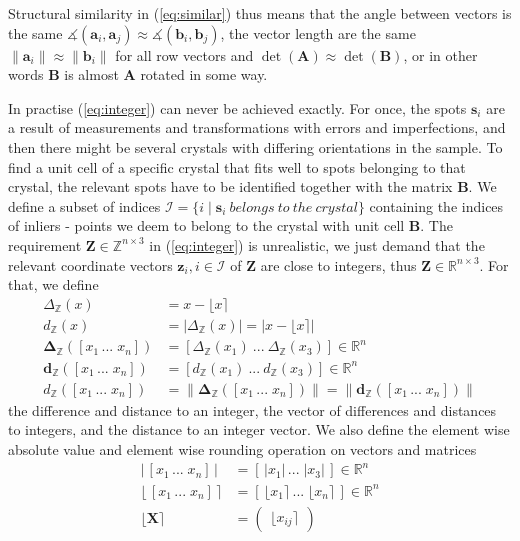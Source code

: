 \documentclass[a4paper,10pt]{article}
\newcommand{\vect}[1]{\mathbf{#1}}
\newcommand{\mat}[1]{\mathbf{#1}}
\newcommand{\round}[1]{\lfloor #1 \rceil}
\newcommand{\distZ}[1]{d_\mathbb{Z}(#1)}
\newcommand{\diffZ}[1]{\Delta_\mathbb{Z}(#1)}
\newcommand{\distvecZ}[1]{\vect{d}_\mathbb{Z}(#1)}
\newcommand{\diffvecZ}[1]{\vect{\Delta}_\mathbb{Z}(#1)}
\begin{document}
%
Structural similarity in (\ref{eq:similar}) thus means that the angle between vectors is the same $\measuredangle(\vect{a}_i, \vect{a}_j) \approx \measuredangle(\vect{b}_i, \vect{b}_j)$, the vector length are the same $\|\vect{a}_i\| \approx \|\vect{b}_i\|$ for all row vectors and $\det(\mat{A}) \approx \det(\mat{B})$, or in other words $\mat{B}$ is almost $\mat{A}$ rotated in some way.

In practise (\ref{eq:integer}) can never be achieved exactly. For once, the spots $\vect{s}_i$ are a result of measurements and transformations with errors and imperfections, and then there might be several crystals with differing orientations in the sample. To find a unit cell of a specific crystal that fits well to spots belonging to that crystal, the relevant spots have to be identified together with the matrix $\mat{B}$. We define a subset of indices $\mathcal{I} = \{i \mid \vect{s}_i\ belongs\ to\ the\ crystal \}$ containing the indices of inliers - points we deem to belong to the crystal with unit cell $\mat{B}$. The requirement $\mat{Z} \in \mathbb{Z}^{n \times 3}$ in (\ref{eq:integer}) is unrealistic, we just demand that the relevant coordinate vectors $\vect{z}_i, i \in \mathcal{I}$ of $\mat{Z}$ are close to integers, thus $\mat{Z} \in \mathbb{R}^{n \times 3}$. For that, we define
%
\[
 \begin{split}
  \diffZ{x} &= x - \round{x}\\
  \distZ{x} &= |\diffZ{x}| = |x - \round{x}|\\
  \diffvecZ{[x_1\, ...\; x_n]} &= [\diffZ{x_1}\ ...\ \diffZ{x_3}] \in \mathbb{R}^n\\
  \distvecZ{[x_1\, ...\; x_n]} &= [\distZ{x_1}\ ...\ \distZ{x_3}] \in \mathbb{R}^n\\
  \distZ{[x_1\, ...\; x_n]} &= \|\diffvecZ{[x_1\, ...\; x_n]}\| = \|\distvecZ{[x_1\, ...\; x_n]}\|
 \end{split}
\]
%
the difference and distance to an integer, the vector of differences and distances to integers, and the distance to an integer vector. We also define the element wise absolute value and element wise rounding operation on vectors and matrices
%
\[
 \begin{split}
  |\,[x_1\, ...\; x_n]\,| &= [\,|x_1|\, ...\; |x_3|\,] \in \mathbb{R}^n \\
  \round{\,[x_1\, ...\; x_n]\,} &= [\,\round{x_1}\, ...\; \round{x_n}\,] \in \mathbb{R}^n \\
  \round{\mat{X}} &= \begin{pmatrix} \round{x_{ij}} \end{pmatrix}
 \end{split}
\]
\end{document}
